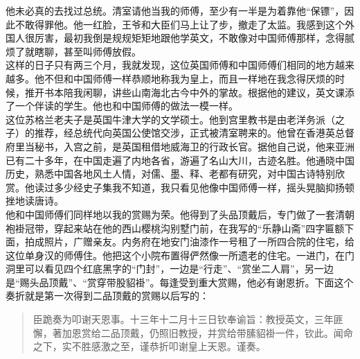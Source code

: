 他未必真的去找过总统。清室请他当我的师傅，至少有一半是为着靠他“保镖”，因此不敢得罪他。他一红脸，王爷和大臣们马上让了步，撤走了太监。我感到这个外国人很厉害，最初我倒是规规矩矩地跟他学英文，不敢像对中国师傅那样，念得腻烦了就瞎聊，甚至叫师傅放假。\\

这样的日子只有两三个月，我就发现，这位英国师傅和中国师傅们相同的地方越来越多。他不但和中国师傅一样恭顺地称我为皇上，而且一样地在我念得厌烦的时候，推开书本陪我闲聊，讲些山南海北古今中外的掌故。根据他的建议，英文课添了一个伴读的学生。他也和中国师傅的做法一模一样。\\

这位苏格兰老夫子是英国牛津大学的文学硕士。他到宫里教书是由老洋务派（之子）的推荐，经总统代向英国公使馆交涉，正式被清室聘来的。他曾在香港英总督府里当秘书，入宫之前，是英国租借地威海卫的行政长官。据他自己说，他来亚洲已有二十多年，在中国走遍了内地各省，游遍了名山大川，古迹名胜。他通晓中国历史，熟悉中国各地风土人情，对儒、墨、释、老都有研究，对中国古诗特别欣赏。他读过多少经史子集我不知道，我只看见他像中国师傅一样，摇头晃脑抑扬顿挫地读唐诗。\\

他和中国师傅们同样地以我的赏赐为荣。他得到了头品顶戴后，专门做了一套清朝袍褂冠带，穿起来站在他的西山樱桃沟别墅门前，在我写的“乐静山斋”四字匾额下面，拍成照片，广赠亲友。内务府在地安门油漆作一号租了一所四合院的住宅，给这位单身汉的师傅住。他把这个小院布置得俨然像一所遗老的住宅。一进门，在门洞里可以看见四个红底黑字的“门封”，一边是“行走”、“赏坐二人肩”，另一边是“赐头品顶戴”、“赏穿带股貂褂”。每逢受到重大赏赐，他必有谢恩折。下面这个奏折就是第一次得到二品顶戴的赏赐以后写的：\\

\begin{quote}
	臣跪奏为叩谢天恩事。十三年十二月十三日钦奉谕旨：教授英文，三年匪懈，著加恩赏给二品顶戴，仍照旧教授，并赏给带膆貂褂一件，钦此。闻命之下，实不胜感激之至，谨恭折叩谢皇上天恩。谨奏。\\
\end{quote}

